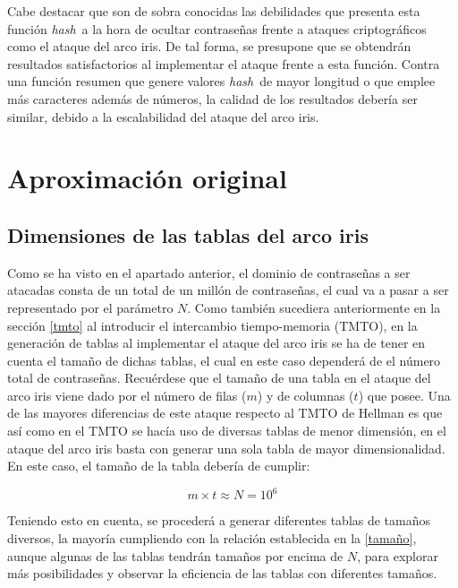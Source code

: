 \documentclass[12pt,spanish,listoffigures,listoftables,listofalgorithms]{tfgetsinf}
\newcommand{\hash}{\textit{hash}}
\begin{document}
Cabe destacar que son de sobra conocidas las debilidades que presenta esta función \hash~a la hora de ocultar contraseñas frente a ataques criptográficos como el ataque del arco iris. De tal forma, se presupone que se obtendrán resultados satisfactorios al implementar el ataque frente a esta función. Contra una función resumen que genere valores \hash~de mayor longitud o que emplee más caracteres además de números, la calidad de los resultados debería ser similar, debido a la escalabilidad del ataque del arco iris.

\section{Aproximación original}

\subsection{Dimensiones de las tablas del arco iris}

Como se ha visto en el apartado anterior, el dominio de contraseñas a ser atacadas consta de un total de un millón de contraseñas, el cual va a pasar a ser representado por el parámetro $N$. Como también sucediera anteriormente en la sección \ref{tmto} al introducir el intercambio tiempo-memoria (TMTO), en la generación de tablas al implementar el ataque del arco iris se ha de tener en cuenta el tamaño de dichas tablas, el cual en este caso dependerá de el número total de contraseñas. Recuérdese que el tamaño de una tabla en el ataque del arco iris viene dado por el número de filas ($m$) y de columnas ($t$) que posee. Una de las mayores diferencias de este ataque respecto al TMTO de Hellman es que así como en el TMTO se hacía uso de diversas tablas de menor dimensión, en el ataque del arco iris basta con generar una sola tabla de mayor dimensionalidad. En este caso, el tamaño de la tabla debería de cumplir:

\begin{center}
    \begin{equation}
        \tag{Fórmula 1}
        m \times t \approx N = 10^6
        \label{tamaño}
    \end{equation}
\end{center}

Teniendo esto en cuenta, se procederá a generar diferentes tablas de tamaños diversos, la mayoría cumpliendo con la relación establecida en la \ref{tamaño}, aunque algunas de las tablas tendrán tamaños por encima de $N$, para explorar más posibilidades y observar la eficiencia de las tablas con diferentes tamaños.
\end{document}
